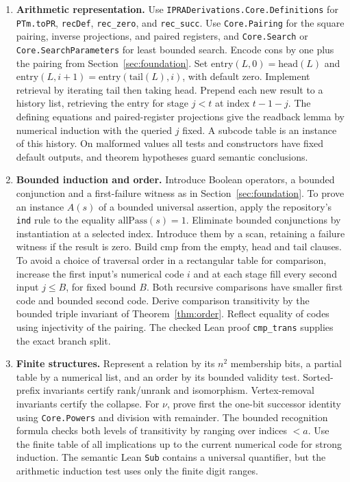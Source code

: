 \begin{enumerate}[leftmargin=*,label=\arabic*.]
\item \textbf{Arithmetic representation.}
Use \texttt{IPRADerivations.Core.Definitions} for \texttt{PTm.toPR}, \texttt{recDef}, \texttt{rec\_zero}, and \texttt{rec\_succ}. Use \texttt{Core.Pairing} for the square pairing, inverse projections, and paired registers, and \texttt{Core.Search} or \texttt{Core.SearchParameters} for least bounded search. Encode cons by one plus the pairing from Section~\ref{sec:foundation}. Set $\mathrm{entry}(L,0)=\mathrm{head}(L)$ and $\mathrm{entry}(L,i+1)=\mathrm{entry}(\mathrm{tail}(L),i)$, with default zero. Implement retrieval by iterating tail then taking head. Prepend each new result to a history list, retrieving the entry for stage $j<t$ at index $t-1-j$. The defining equations and paired-register projections give the readback lemma by numerical induction with the queried $j$ fixed. A subcode table is an instance of this history. On malformed values all tests and constructors have fixed default outputs, and theorem hypotheses guard semantic conclusions.
\item \textbf{Bounded induction and order.}
Introduce Boolean operators, a bounded conjunction and a first-failure witness as in Section~\ref{sec:foundation}. To prove an instance $A(s)$ of a bounded universal assertion, apply the repository's \texttt{ind} rule to the equality $\mathrm{allPass}(s)=1$. Eliminate bounded conjunctions by instantiation at a selected index. Introduce them by a scan, retaining a failure witness if the result is zero. Build $\mathrm{cmp}$ from the empty, head and tail clauses. To avoid a choice of traversal order in a rectangular table for comparison, increase the first input's numerical code $i$ and at each stage fill every second input $j\le B$, for fixed bound $B$. Both recursive comparisons have smaller first code and bounded second code. Derive comparison transitivity by the bounded triple invariant of Theorem~\ref{thm:order}. Reflect equality of codes using injectivity of the pairing. The checked Lean proof \texttt{cmp\_trans} supplies the exact branch split.
\item \textbf{Finite structures.}
Represent a relation by its $n^2$ membership bits, a partial table by a numerical list, and an order by its bounded validity test. Sorted-prefix invariants certify rank/unrank and isomorphism. Vertex-removal invariants certify the collapse. For $\nu$, prove first the one-bit successor identity using \texttt{Core.Powers} and division with remainder. The bounded recognition formula checks both levels of transitivity by ranging over indices $<a$. Use the finite table of all implications up to the current numerical code for strong induction. The semantic Lean \texttt{Sub} contains a universal quantifier, but the arithmetic induction test uses only the finite digit ranges.

\end{enumerate}
